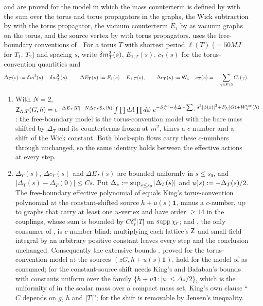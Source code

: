 \begin{proposition}\label{rot:prop:CT}
\cite{K1} and \cite{Ba1,Ba2,Ba3} are proved for the model in which the mass counterterm is defined by \cite[(3.33)]{K1} with the sum over the torus and torus propagators in the graphs, the Wick subtraction by \cite[(2.8)]{K1} with the torus propagator, the vacuum counterterm $E_1$ by \cite[(3.35)]{K1} as vacuum graphs on the torus, and the source vertex by \cite[(3.21)]{K1} with torus propagators.  uses the free-boundary conventions of \cite[p.~330]{K2}. For a torus $T$ with shortest period $\ell(T)$ ($=50MJ$ for $T_1$, $T_2$) and spacing $s$, write $\delta m^2_T(s)$, $E_{1,T}(s)$, $c_T(s)$ for the torus-convention quantities and
\[
\Delta_T(s):=\delta m^2(s)-\delta m^2_T(s),\qquad\Delta E_T(s):= E_1(s)-E_{1,T}(s),\qquad\Delta c_T(s):=\mathsf W_s-c_T(s)=-\sum_{\gamma\in P\setminus0}C_s(\gamma).
\]
\begin{enumerate}[label=\textup{(\alph*)},leftmargin=*]
\item With $N=2$,
$\mathsf Z_{\Lambda,T}(G,h)=e^{-\Delta E_T|T|-N\Delta c_T\mathsf S_\Lambda(h)}\int\prod dA\prod d\phi\ e^{-S^{\rm tor}_\Lambda-\frac12\Delta_T\sum_xs^3|\phi(x)|^2+F_\Lambda(G)+W^{\rm tor}_\Lambda(h)}$:
the free-boundary model is the torus-convention model with the bare mass shifted by $\Delta_T$ and its counterterms frozen at $m^2$, times a $c$-number and a shift of the Wick constant. Both block-spin flows carry these $c$-numbers through unchanged, so the same identity holds between the effective actions at every step.
\item $\Delta_T(s)$, $\Delta c_T(s)$ and $\Delta E_T(s)$ are bounded uniformly in $s\le s_0$, and $|\Delta_T(s)-\Delta_T(0)|\le Cs$. Put $\Delta_*:=\sup_{s\le s_0}|\Delta_T(s)|$ and $u(s):=-\Delta_T(s)/2$. The free-boundary effective polynomial of  equals King's torus-convention polynomial at the constant-shifted source $h+u(s)\mathbf 1$, minus a $c$-number, up to graphs that carry at least one $u$-vertex and have order $\ge14$ in the couplings, whose sum is bounded by $C\delta_r^\sigma|T|$ on $\operatorname{supp}\chi_r$; and , the only consumer of , is $c$-number blind: multiplying each lattice's $\mathsf Z$ and small-field integral by an arbitrary positive constant leaves every step and the conclusion unchanged. Consequently the extensive bounds , proved for the torus-convention model at the sources $(zG,h+u(s)\mathbf 1)$, hold for the model of  as consumed; for  the constant-source shift needs King's and Ba{\l}aban's bounds with constants uniform over the family $\{h+u\mathbf 1:|u|\le\Delta_*/2\}$, which is the uniformity of \cite[Thm.~3.1]{K1} in the scalar mass over a compact mass set, King's own clause ``$C$ depends on $g$, $h$ and $|T|$''; for  the shift is removable by Jensen's inequality.

\end{enumerate}
\end{proposition}
